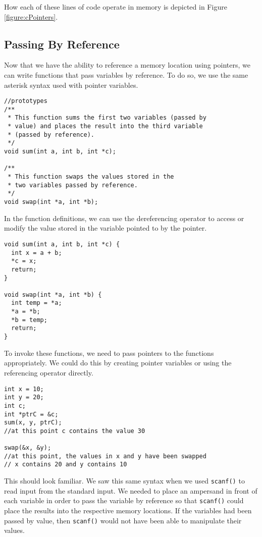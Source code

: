 How each of these lines of code operate in memory is depicted
in Figure \ref{figure:cPointers}.  



\subsection{Passing By Reference}

Now that we have the ability to reference a memory location 
using pointers, we can write functions that pass variables by 
reference.  To do so, we use the same asterisk syntax used
with pointer variables.

\begin{verbatim}
//prototypes
/**
 * This function sums the first two variables (passed by
 * value) and places the result into the third variable 
 * (passed by reference).
 */
void sum(int a, int b, int *c);

/**
 * This function swaps the values stored in the
 * two variables passed by reference.
 */
void swap(int *a, int *b);
\end{verbatim}

In the function definitions, we can use the dereferencing
operator to access or modify the value stored in the
variable pointed to by the pointer.  

\begin{verbatim}
void sum(int a, int b, int *c) {
  int x = a + b;
  *c = x;
  return;
}

void swap(int *a, int *b) {
  int temp = *a;
  *a = *b;
  *b = temp;
  return;
}
\end{verbatim}

To invoke these functions, we need to pass pointers to 
the functions appropriately.  We could do this by
creating pointer variables or using the referencing operator
directly.

\begin{verbatim}
int x = 10;
int y = 20;
int c;
int *ptrC = &c;
sum(x, y, ptrC);
//at this point c contains the value 30

swap(&x, &y);
//at this point, the values in x and y have been swapped
// x contains 20 and y contains 10
\end{verbatim}

This should look familiar.  We saw this same syntax when
we used \texttt{scanf()} to read input from the standard
input.  We needed to place an ampersand in front of each
variable in order to pass the variable by reference so that
\texttt{scanf()} could place the results into the respective
memory locations.  If the variables had been passed by 
value, then \texttt{scanf()} would not have been able
to manipulate their values.

